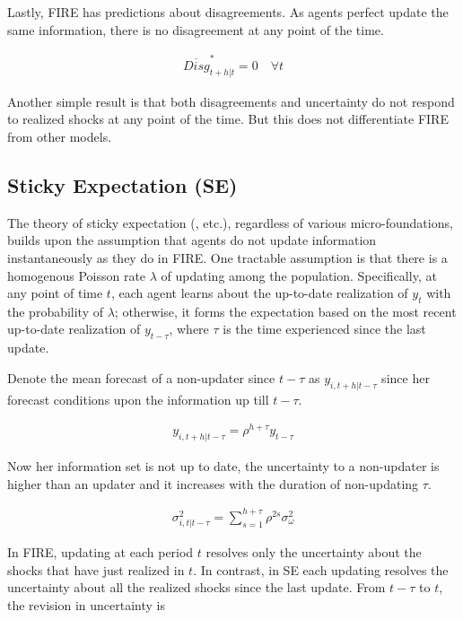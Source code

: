 \documentclass[12pt]{article}
\begin{document}
	Lastly, FIRE has predictions about disagreements. As agents perfect update the same information, there is no disagreement at any point of the time. 
	
	\begin{eqnarray}\label{DisgREPop}
		\overline{Disg}^{*}_{t+h|t}=0 \quad \forall t
	\end{eqnarray}
	
	Another simple result is that both disagreements and uncertainty do not respond to realized shocks at any point of the time. But this does not differentiate FIRE from other models. 
	
	\subsection{Sticky Expectation (SE)}
	
	The theory of sticky expectation (\citet{mankiw2002sticky}, \citet{carroll2003macroeconomic} etc.), regardless of various micro-foundations, builds upon the assumption that agents do not update information instantaneously as they do in FIRE. One tractable assumption is that there is a homogenous Poisson rate $\lambda$ of updating among the population. Specifically, at any point of time $t$, each agent learns about the up-to-date realization of $y_t$ with the probability of $\lambda$; otherwise, it forms the expectation based on the most recent up-to-date realization of $y_{t-\tau}$, where $\tau$ is the time experienced since the last update. 
	
	Denote the mean forecast of a non-updater since $t-\tau$ as $y_{i,t+h|t-\tau}$ since her forecast conditions upon the information up till $t-\tau$. 
	
	\begin{eqnarray} 
		y_{i,t+h|t-\tau} = \rho^{h+\tau} y_{t-\tau}
	\end{eqnarray}
	
	Now her information set is not up to date, the uncertainty to a non-updater is higher than an updater and it increases with the duration of non-updating $\tau$. 
	
	\begin{eqnarray}\label{VarSEInd}
		\sigma^2_{i,t|t-\tau}= \sum^{h+\tau}_{s=1}\rho^{2s} \sigma^2_{\omega}
	\end{eqnarray}	
	
	In FIRE, updating at each period $t$ resolves only the uncertainty about the shocks that have just realized in $t$. In contrast, in SE each updating resolves the uncertainty about all the realized shocks since the last update. From $t-\tau$ to $t$, the revision in uncertainty is 
	
\end{document}
